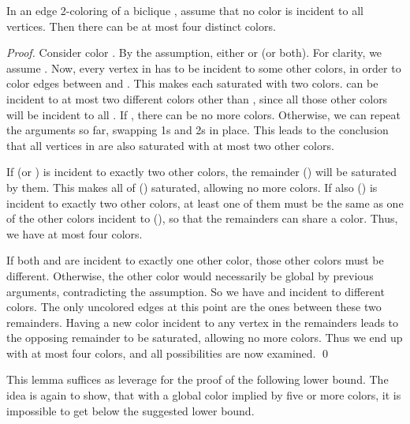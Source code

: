 \documentclass[runningheads, a4paper]{llncs}
\begin{document}
\begin{lemma}\label{lemma:biclique}
In an edge 2-coloring of a biclique , assume that no color is incident to all vertices. Then there can be at most four distinct colors.
\end{lemma}
\begin{proof}
Consider color . By the assumption, either  or  (or both). For clarity, we assume . Now, every vertex in  has to be incident to some other colors, in order to color edges between  and . This makes each  saturated with two colors.  can be incident to at most two different colors other than , since all those other colors will be incident to all . If , there can be no more colors. Otherwise, we can repeat the arguments so far, swapping 1s and 2s in place. This leads to the conclusion that all vertices in  are also saturated with at most two other colors.

If  (or ) is incident to exactly two other colors, the remainder  () will be saturated by them. This makes all of  () saturated, allowing no more colors. If also  () is incident to exactly two other colors, at least one of them must be the same as one of the other colors incident to  (), so that the remainders can share a color. Thus, we have at most four colors.

If both  and  are incident to exactly one other color, those other colors must be different. Otherwise, the other color would necessarily be global by previous arguments, contradicting the assumption. So we have  and  incident to different colors. The only uncolored edges at this point are the ones between these two remainders. Having a new color incident to any vertex in the remainders leads to the opposing remainder to be saturated, allowing no more colors. Thus we end up with at most four colors, and all possibilities are now examined. \qed
\end{proof}

This lemma suffices as leverage for the proof of the following lower bound. The idea is again to show, that with a global color implied by five or more colors, it is impossible to get below the suggested lower bound.
\end{document}
